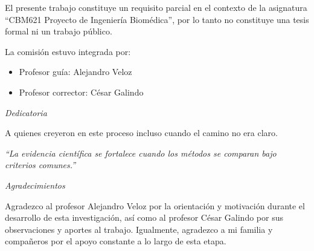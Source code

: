 \documentclass[12pt,letterpaper]{article}
\newcommand{\ProfesorGuia}{Alejandro Veloz}
\newcommand{\ProfesorCorrector}{César Galindo}
\begin{document}
El presente trabajo constituye un requisito parcial en el contexto de la asignatura
``CBM621 Proyecto de Ingeniería Biomédica'', por lo tanto no constituye una tesis
formal ni un trabajo público.

\vspace{0.5cm}
La comisión estuvo integrada por:

\begin{itemize}[leftmargin=2em, topsep=4pt, itemsep=2pt]
  \item Profesor guía: \ProfesorGuia
  \item Profesor corrector: \ProfesorCorrector
\end{itemize}

\newpage


\thispagestyle{sinCabecera}
\sffamily
\vspace*{3cm}

\begin{center}
  {\itshape Dedicatoria}
\end{center}

\vspace{0.5cm}
\small\justify
A quienes creyeron en este proceso incluso cuando el camino no era claro.

\vspace{1.5cm}
\begin{flushright}
  \itshape
  ``La evidencia científica se fortalece cuando los métodos se comparan bajo criterios comunes.''\\[0.3cm]
\end{flushright}


\thispagestyle{sinCabecera}
\sffamily
\vspace*{3cm}

\begin{center}
  {\itshape Agradecimientos}
\end{center}

\vspace{0.5cm}
\small\justify
Agradezco al profesor Alejandro Veloz por la orientación y motivación
durante el desarrollo de esta investigación, así como al profesor César
Galindo por sus observaciones y aportes al trabajo. Igualmente, agradezco
a mi familia y compañeros por el apoyo constante a lo largo de esta etapa.
\end{document}
